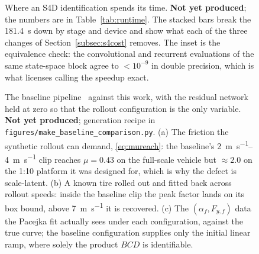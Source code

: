 \begin{figure}[t]
\centering
{}
\caption{Where an S4D identification spends its time.
\textbf{Not yet produced}; the numbers are in Table~\ref{tab:runtime}. The
stacked bars break the \SI{181.4}{\second} down by stage and device and show
what each of the three changes of Section~\ref{subsec:s4cost} removes. The
inset is the equivalence check: the convolutional and recurrent evaluations of
the same state-space block agree to $<10^{-9}$ in double precision, which is
what licenses calling the speedup exact.}
\label{fig:runtime}
\end{figure}

\begin{figure}[t]
\centering
{}
\caption{The baseline pipeline~\cite{ontrack2024} against this work, with the
residual network held at zero so that the rollout configuration is the only
variable. \textbf{Not yet produced}; generation recipe in
\texttt{figures/make\_baseline\_comparison.py}. (a) The friction the synthetic
rollout can demand, \eqref{eq:mureach}: the baseline's
\SIrange{2}{4}{\meter\per\second} clip reaches $\mu=0.43$ on the full-scale
vehicle but $\approx2.0$ on the 1:10 platform it was designed for, which is
why the defect is scale-latent. (b) A known tire rolled out and fitted back
across rollout speeds: inside the baseline clip the peak factor lands on its
box bound, above \SI{7}{\meter\per\second} it is recovered. (c) The
$(\alpha_{f},F_{y,f})$ data the Pacejka fit actually sees under each
configuration, against the true curve; the baseline configuration supplies
only the initial linear ramp, where solely the product $BCD$ is
identifiable.}
\label{fig:baseline}
\end{figure}
